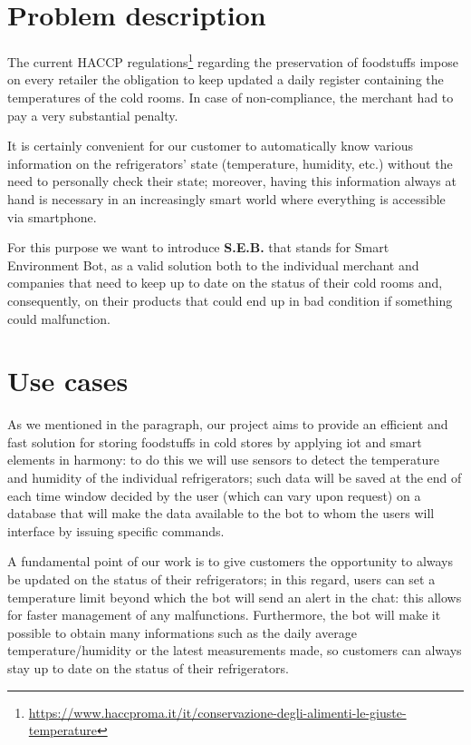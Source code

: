 \section{Problem description}\label{sec:prob_desc}
The current HACCP regulations\footnote{\url{https://www.haccproma.it/it/conservazione-degli-alimenti-le-giuste-temperature}} regarding the preservation of foodstuffs impose on every retailer the obligation to keep updated a daily register containing the temperatures of the cold rooms. In case of non-compliance, the merchant had to pay a very substantial penalty.
\vspace{3mm}

It is certainly convenient for our customer to automatically know various information on the refrigerators' state (temperature, humidity, etc.) without the need to personally check their state; moreover, having this information always at hand is necessary in an increasingly smart world where everything is accessible via smartphone.
\vspace{3mm}

For this purpose we want to introduce \textbf{S.E.B.} that stands for Smart Environment Bot, as a valid solution both to the individual merchant and companies that need to keep up to date on the status of their cold rooms and, consequently, on their products that could end up in bad condition if something could malfunction.

\section{Use cases}
As we mentioned in the \textbf{} paragraph, our project aims to provide an efficient and fast solution for storing foodstuffs in cold stores by applying iot and smart elements in harmony: to do this we will use sensors to detect the temperature and humidity of the individual refrigerators; such data will be saved at the end of each time window decided by the user (which can vary upon request) on a database that will make the data available to the bot to whom the users will interface by issuing specific commands.
\vspace{3mm}

A fundamental point of our work is to give customers the opportunity to always be updated on the status of their refrigerators; in this regard, users can set a temperature limit beyond which the bot will send an alert in the chat: this allows for faster management of any malfunctions.
Furthermore, the bot will make it possible to obtain many informations such as the daily average temperature/humidity or the latest measurements made, so customers can always stay up to date on the status of their refrigerators.
\vspace{3mm}

